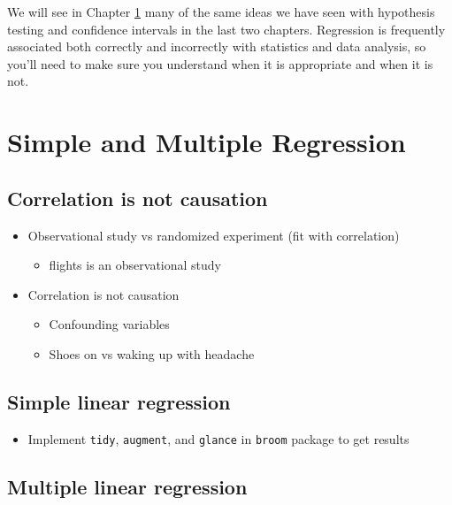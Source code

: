 \documentclass[]{tufte-book}
\providecommand{\tightlist}{%
  \setlength{\itemsep}{0pt}\setlength{\parskip}{0pt}}
\begin{document}
We will see in Chapter \ref{regress} many of the same ideas we have seen
with hypothesis testing and confidence intervals in the last two
chapters. Regression is frequently associated both correctly and
incorrectly with statistics and data analysis, so you'll need to make
sure you understand when it is appropriate and when it is not.

\chapter{Simple and Multiple Regression}\label{regress}

\section{Correlation is not
causation}\label{correlation-is-not-causation}

\begin{itemize}
\tightlist
\item
  Observational study vs randomized experiment (fit with correlation)

  \begin{itemize}
  \tightlist
  \item
    flights is an observational study
  \end{itemize}
\item
  Correlation is not causation

  \begin{itemize}
  \tightlist
  \item
    Confounding variables
  \item
    Shoes on vs waking up with headache
  \end{itemize}
\end{itemize}

\section{Simple linear regression}\label{simple-linear-regression}

\begin{itemize}
\tightlist
\item
  Implement \texttt{tidy}, \texttt{augment}, and \texttt{glance} in
  \texttt{broom} package to get results
\end{itemize}

\section{Multiple linear regression}\label{mlr}
\end{document}
